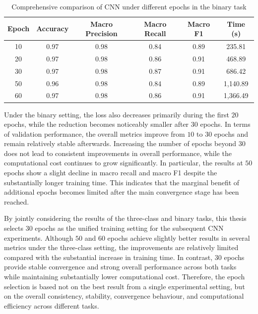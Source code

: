 \begin{table}[htbp]
    \centering
    \caption{Comprehensive comparison of CNN under different epochs in the binary task}
    \label{tab:epoch-binary-cnn}
    \begin{tabular}{cccccc}
        \toprule
        Epoch & Accuracy & Macro Precision &
        Macro Recall & Macro F1 & Time (s) \\
        \midrule
        10 & 0.97 & 0.98 & 0.84 & 0.89 & 235.81  \\
        20 & 0.97 & 0.98 & 0.86 & 0.91 & 468.89  \\
        30 & 0.97 & 0.98 & 0.87 & 0.91 & 686.42  \\
        50 & 0.96 & 0.98 & 0.84 & 0.89 & 1,140.89 \\
        60 & 0.97 & 0.98 & 0.86 & 0.91 & 1,366.49 \\
        \bottomrule
    \end{tabular}
\end{table}

\par Under the binary setting, the loss also decreases primarily during the
first $20$ epochs, while the reduction becomes noticeably smaller after
$30$ epochs. In terms of validation performance, the overall metrics improve
from $10$ to $30$ epochs and remain relatively stable afterwards. Increasing
the number of epochs beyond $30$ does not lead to consistent improvements in
overall performance, while the computational cost continues to grow
significantly. In particular, the results at $50$ epochs show a slight decline
in macro recall and macro F1 despite the substantially longer training time.
This indicates that the marginal benefit of additional epochs becomes limited
after the main convergence stage has been reached.

\par By jointly considering the results of the three-class and binary tasks,
this thesis selects $30$ epochs as the unified training setting for the
subsequent CNN experiments. Although $50$ and $60$ epochs achieve slightly
better results in several metrics under the three-class setting, the
improvements are relatively limited compared with the substantial increase in
training time. In contrast, $30$ epochs provide stable convergence and strong
overall performance across both tasks while maintaining substantially lower
computational cost. Therefore, the epoch selection is based not on the best
result from a single experimental setting, but on the overall consistency,
stability, convergence behaviour, and computational efficiency across different
tasks.

